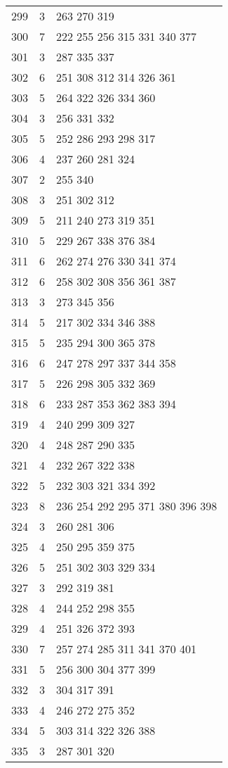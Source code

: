 \documentclass{standalone}
\begin{document}
\begin{tabular}{c c l}
299 & 3 & 263 270 319 \\
300 & 7 & 222 255 256 315 331 340 377 \\
301 & 3 & 287 335 337 \\
302 & 6 & 251 308 312 314 326 361 \\
303 & 5 & 264 322 326 334 360 \\
304 & 3 & 256 331 332 \\
305 & 5 & 252 286 293 298 317 \\
306 & 4 & 237 260 281 324 \\
307 & 2 & 255 340 \\
308 & 3 & 251 302 312 \\
309 & 5 & 211 240 273 319 351 \\
310 & 5 & 229 267 338 376 384 \\
311 & 6 & 262 274 276 330 341 374 \\
312 & 6 & 258 302 308 356 361 387 \\
313 & 3 & 273 345 356 \\
314 & 5 & 217 302 334 346 388 \\
315 & 5 & 235 294 300 365 378 \\
316 & 6 & 247 278 297 337 344 358 \\
317 & 5 & 226 298 305 332 369 \\
318 & 6 & 233 287 353 362 383 394 \\
319 & 4 & 240 299 309 327 \\
320 & 4 & 248 287 290 335 \\
321 & 4 & 232 267 322 338 \\
322 & 5 & 232 303 321 334 392 \\
323 & 8 & 236 254 292 295 371 380 396 398 \\
324 & 3 & 260 281 306 \\
325 & 4 & 250 295 359 375 \\
326 & 5 & 251 302 303 329 334 \\
327 & 3 & 292 319 381 \\
328 & 4 & 244 252 298 355 \\
329 & 4 & 251 326 372 393 \\
330 & 7 & 257 274 285 311 341 370 401 \\
331 & 5 & 256 300 304 377 399 \\
332 & 3 & 304 317 391 \\
333 & 4 & 246 272 275 352 \\
334 & 5 & 303 314 322 326 388 \\
335 & 3 & 287 301 320 \\

\end{tabular}
\end{document}

